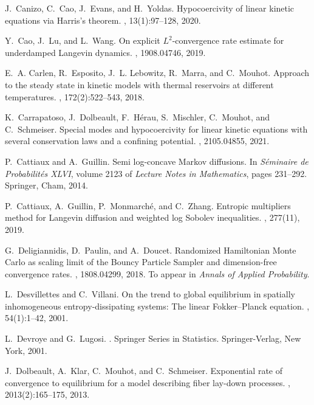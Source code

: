 \documentclass{article}
\begin{document}
\begin{thebibliography}{10}
J.~Canizo, C.~Cao, J.~Evans, and H.~Yoldas.
\newblock Hypocoercivity of linear kinetic equations via {H}arris’s theorem.
, 13(1):97--128, 2020.

Y.~Cao, J.~Lu, and L.~Wang.
\newblock On explicit {$L^2$}-convergence rate estimate for underdamped
  {L}angevin dynamics.
, 1908.04746, 2019.

E.~A. Carlen, R.~Esposito, J.~L. Lebowitz, R.~Marra, and C.~Mouhot.
\newblock Approach to the steady state in kinetic models with thermal
  reservoirs at different temperatures.
, 172(2):522--543, 2018.

K.~Carrapatoso, J.~Dolbeault, F.~Hérau, S.~Mischler, C.~Mouhot, and
  C.~Schmeiser.
\newblock Special modes and hypocoercivity for linear kinetic equations with
  several conservation laws and a confining potential.
, 2105.04855, 2021.

P.~Cattiaux and A.~Guillin.
\newblock Semi log-concave {M}arkov diffusions.
\newblock In {\em S\'{e}minaire de {P}robabilit\'{e}s {XLVI}}, volume 2123 of
  {\em Lecture Notes in Mathematics}, pages 231--292. Springer, Cham, 2014.

P.~Cattiaux, A.~Guillin, P.~Monmarch\'{e}, and C.~Zhang.
\newblock Entropic multipliers method for {L}angevin diffusion and weighted log
  {S}obolev inequalities.
, 277(11), 2019.

G.~Deligiannidis, D.~Paulin, and A.~Doucet.
\newblock Randomized {Hamiltonian Monte Carlo} as scaling limit of the {Bouncy
  Particle Sampler} and dimension-free convergence rates.
, 1808.04299, 2018.
\newblock To appear in \emph{Annals of Applied Probability}.

L.~Desvillettes and C.~Villani.
\newblock On the trend to global equilibrium in spatially inhomogeneous
  entropy-dissipating systems: {T}he linear {F}okker--{P}lanck equation.
, 54(1):1--42, 2001.

L.~Devroye and G.~Lugosi.
.
\newblock Springer Series in Statistics. Springer-Verlag, New York, 2001.

J.~Dolbeault, A.~Klar, C.~Mouhot, and C.~Schmeiser.
\newblock Exponential rate of convergence to equilibrium for a model describing
  fiber lay-down processes.
, 2013(2):165--175, 2013.


\end{thebibliography}
\end{document}
